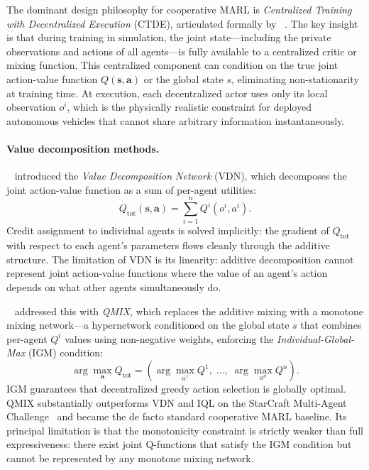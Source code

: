 \documentclass[12pt, a4paper]{article}
\begin{document}
The dominant design philosophy for cooperative MARL is \emph{Centralized
Training with Decentralized Execution} (CTDE), articulated formally by
\citeauthor{kraemer2016multi}~\cite{kraemer2016multi}.  The key insight is
that during training in simulation, the joint state---including the private
observations and actions of all agents---is fully available to a centralized
critic or mixing function.  This centralized component can condition on the
true joint action-value function $Q(\mathbf{s}, \mathbf{a})$ or the global
state $s$, eliminating non-stationarity at training time.  At execution, each
decentralized actor uses only its local observation $o^i$, which is the
physically realistic constraint for deployed autonomous vehicles that cannot
share arbitrary information instantaneously.

\paragraph{Value decomposition methods.}
\citeauthor{sunehag2018value}~\cite{sunehag2018value} introduced the
\emph{Value Decomposition Network} (VDN), which decomposes the joint
action-value function as a sum of per-agent utilities:
\[
  Q_{\text{tot}}(\mathbf{s}, \mathbf{a}) = \sum_{i=1}^{n} Q^i(o^i, a^i).
\]
Credit assignment to individual agents is solved implicitly: the gradient of
$Q_{\text{tot}}$ with respect to each agent's parameters flows cleanly through
the additive structure.  The limitation of VDN is its linearity: additive
decomposition cannot represent joint action-value functions where the value of
an agent's action depends on what other agents simultaneously do.

\citeauthor{rashid2018qmix}~\cite{rashid2018qmix} addressed this with
\emph{QMIX}, which replaces the additive mixing with a monotone mixing
network---a hypernetwork conditioned on the global state $s$ that combines
per-agent $Q^i$ values using non-negative weights, enforcing the
\emph{Individual-Global-Max} (IGM) condition:
\[
  \arg\max_{\mathbf{a}} Q_{\text{tot}} = \left(
    \arg\max_{a^1} Q^1, \;\ldots,\; \arg\max_{a^n} Q^n
  \right).
\]
IGM guarantees that decentralized greedy action selection is globally optimal.
QMIX substantially outperforms VDN and IQL on the StarCraft Multi-Agent
Challenge~\cite{samvelyan2019starcraft} and became the de facto standard
cooperative MARL baseline.  Its principal limitation is that the monotonicity
constraint is strictly weaker than full expressiveness: there exist joint
Q-functions that satisfy the IGM condition but cannot be represented by any
monotone mixing network.
\end{document}
